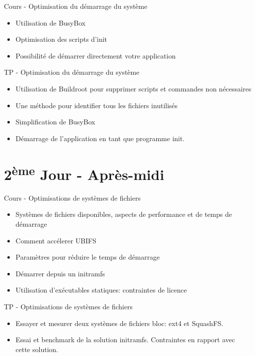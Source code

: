 \documentclass[a4paper,12pt,obeyspaces,spaces,hyphens]{article}
\begin{document}
\feagendatwocolumn
{Cours - Optimisation du démarrage du système}
{
  \begin{itemize}
  \item Utilisation de BusyBox 
  \item Optimisation des scripts d'init
  \item Possibilité de démarrer directement votre application
  \end{itemize}
}
{TP - Optimisation du démarrage du système}
{
 \begin{itemize}
 \item Utilisation de Buildroot pour supprimer scripts et commandes non nécessaires
 \item Une méthode pour identifier tous les fichiers inutilisés
 \item Simplification de BusyBox
 \item Démarrage de l'application en tant que programme init.
 \end{itemize}
}

\section{2\textsuperscript{ème} Jour - Après-midi}

\feagendatwocolumn
{Cours - Optimisations de systèmes de fichiers}
{
  \begin{itemize}
  \item Systèmes de fichiers disponibles, aspects de performance et de temps de démarrage
  \item Comment accélerer UBIFS
  \item Paramètres pour réduire le temps de démarrage
  \item Démarrer depuis un initramfs
  \item Utilisation d'exécutables statiques: contraintes de licence
  \end{itemize}
}
{TP - Optimisations de systèmes de fichiers}
{
 \begin{itemize}
 \item Essayer et mesurer deux systèmes de fichiers bloc: ext4 et SquashFS.
 \item Essai et benchmark de la solution initramfs. Contraintes
       en rapport avec cette solution.
 \end{itemize}
}
\end{document}
